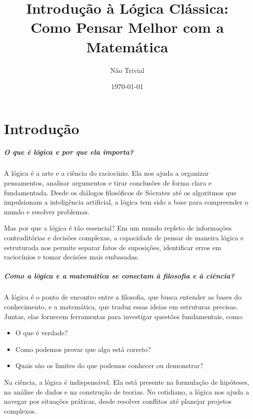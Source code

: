\documentclass[a4paper,12pt]{book}
\title{Introdução à Lógica Clássica: Como Pensar Melhor com a Matemática}
\author{Não Trivial}
\date{\today}
\begin{document}
\maketitle
\newpage


\tableofcontents
\newpage

\chapter*{Introdução}  

\paragraph{O que é lógica e por que ela importa?}  
A lógica é a arte e a ciência do raciocínio. Ela nos ajuda a organizar pensamentos, analisar argumentos e tirar conclusões de forma clara e fundamentada. Desde os diálogos filosóficos de Sócrates até os algoritmos que impulsionam a inteligência artificial, a lógica tem sido a base para compreender o mundo e resolver problemas.  

Mas por que a lógica é tão essencial? Em um mundo repleto de informações contraditórias e decisões complexas, a capacidade de pensar de maneira lógica e estruturada nos permite separar fatos de suposições, identificar erros em raciocínios e tomar decisões mais embasadas.  

\paragraph{Como a lógica e a matemática se conectam à filosofia e à ciência?}  
A lógica é o ponto de encontro entre a filosofia, que busca entender as bases do conhecimento, e a matemática, que traduz essas ideias em estruturas precisas. Juntas, elas fornecem ferramentas para investigar questões fundamentais, como:  

\begin{itemize}  
    \item O que é verdade?  
    \item Como podemos provar que algo está correto?  
    \item Quais são os limites do que podemos conhecer ou demonstrar?  
\end{itemize}  

Na ciência, a lógica é indispensável. Ela está presente na formulação de hipóteses, na análise de dados e na construção de teorias. No cotidiano, a lógica nos ajuda a navegar por situações práticas, desde resolver conflitos até planejar projetos complexos.  
\end{document}
